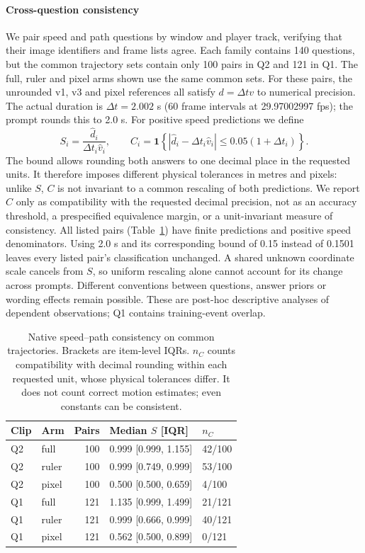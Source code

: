 \documentclass[11pt]{article}
\begin{document}
\paragraph{Cross-question consistency}
\label{app:consistency}
We pair speed and path questions by window and player track, verifying that
their image identifiers and frame lists agree. Each family contains 140
questions, but the common trajectory sets contain only 100 pairs in Q2 and
121 in Q1. The full, ruler and pixel arms shown use the same common sets.
For these pairs, the unrounded v1, v3 and pixel references all satisfy
$d=\Delta t v$ to numerical precision. The actual duration is
$\Delta t=2.002$ s (60 frame intervals at 29.97002997 fps); the prompt
rounds this to 2.0 s. For positive speed predictions we define
\begin{equation}
 S_i=\frac{\hat d_i}{\Delta t_i\hat v_i},\qquad
 C_i=\mathbf{1}\!\left\{
 |\hat d_i-\Delta t_i\hat v_i|\leq0.05(1+\Delta t_i)\right\}.
\end{equation}
The bound allows rounding both answers to one decimal place in the requested
units. It therefore imposes different physical tolerances in metres and
pixels: unlike $S$, $C$ is not invariant to a common rescaling of both
predictions. We report $C$ only as compatibility with the requested decimal
precision, not as an accuracy threshold, a prespecified equivalence margin,
or a unit-invariant measure of consistency.
All listed pairs (Table~\ref{tab:cross-question}) have finite predictions and positive speed denominators.
Using 2.0 s and its corresponding bound of 0.15 instead of 0.1501 leaves
every listed pair's classification unchanged. A shared unknown coordinate
scale cancels from $S$, so uniform rescaling alone cannot account for its
change across prompts. Different conventions between questions, answer priors
or wording effects remain possible. These are post-hoc descriptive analyses
of dependent observations; Q1 contains training-event overlap.

\begin{table}[t]
\centering\small
\caption{Native speed--path consistency on common trajectories.
Brackets are item-level IQRs. $n_C$ counts compatibility with decimal
rounding within each requested unit, whose physical tolerances differ.
It does not count correct motion estimates; even constants can be consistent.}
\label{tab:cross-question}
\begin{tabular}{llrll}
\toprule
Clip & Arm & Pairs & Median $S$ [IQR] & $n_C$ \\
\midrule
Q2 & full & 100 & 0.999 [0.999, 1.155] & 42/100 \\
Q2 & ruler & 100 & 0.999 [0.749, 0.999] & 53/100 \\
Q2 & pixel & 100 & 0.500 [0.500, 0.659] & 4/100 \\
Q1 & full & 121 & 1.135 [0.999, 1.499] & 21/121 \\
Q1 & ruler & 121 & 0.999 [0.666, 0.999] & 40/121 \\
Q1 & pixel & 121 & 0.562 [0.500, 0.899] & 0/121 \\
\bottomrule
\end{tabular}
\end{table}
\end{document}
